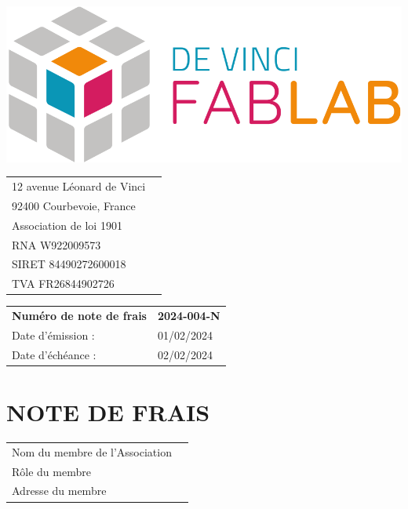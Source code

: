 \documentclass[11pt,a4paper]{article}
\begin{document}
\thispagestyle{empty}


\begin{minipage}{0.4\textwidth}
    \includegraphics[width=0.7\linewidth]{../../assets/logo_fablab.png}

    \vspace{0.5cm}

    \begin{tabular}{ll}
        12 avenue Léonard de Vinci \\
        92400 Courbevoie, France   \\
        Association de loi 1901    \\
        RNA W922009573             \\
        SIRET 84490272600018       \\
        TVA  FR26844902726         \\
    \end{tabular}
\end{minipage}\begin{minipage}{0.6\textwidth}
    \begin{flushright}
        \begin{tabular}{ll}
            \textbf{Numéro de note de frais} & \textbf{2024-004-N} \\
            Date d'émission :                & 01/02/2024          \\
            Date d'échéance :                & 02/02/2024          \\
        \end{tabular}
    \end{flushright}
\end{minipage}

\begin{minipage}[t]{0.5\textwidth}
    \hspace*{0pt}\vspace*{\fill}
    \section*{\LARGE NOTE DE FRAIS}
\end{minipage}\begin{minipage}[t]{0.5\textwidth}
    \begin{framed}
        \begin{tabular}{ll}
            Nom du membre de l'Association \\
            Rôle du membre                 \\
            Adresse du membre              \\
        \end{tabular}
    \end{framed}
    \vspace{0.1cm}
\end{minipage}
\end{document}

